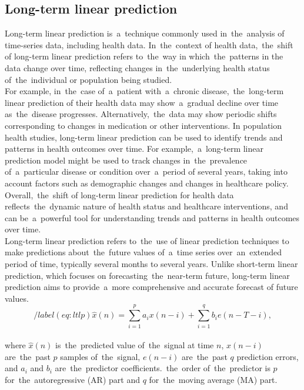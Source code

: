 \subsection{Long-term linear prediction}\label{subsec:longlp}
Long-term linear prediction is~a~technique commonly used in~the~analysis of time-series data, including health data.
In~the~context of health data,~the~shift of long-term linear prediction refers to~the~way in which~the~patterns in the
data change over time, reflecting changes in~the~underlying health status of~the~individual or population being studied.\\
For example, in~the~case of~a~patient with~a~chronic disease,~the~long-term linear prediction of their health data may
show~a~gradual decline over time as~the~disease progresses. Alternatively,~the~data may show periodic shifts
corresponding to changes in medication or other interventions. In population health studies, long-term linear
prediction can be used to identify trends and patterns in health outcomes over time. For example,~a~long-term linear
prediction model might be used to track changes in~the~prevalence of~a~particular disease or condition
over~a~period of several years, taking into account factors such as demographic changes and changes in healthcare policy.
Overall,~the~shift of long-term linear prediction for health data reflects~the~dynamic nature of health status and
healthcare interventions, and can be~a~powerful tool for understanding trends and patterns in health outcomes over time.
\\
Long-term linear prediction refers to~the~use of linear prediction techniques to make predictions about~the~future
values of~a~time series over~an~extended period of time, typically several months to several years. Unlike short-term
linear prediction, which focuses on forecasting~the~near-term future, long-term linear prediction aims to provide~a~more
comprehensive and accurate forecast of future values.\\
\begin{equation}/label(eq:ltlp)
    \hat{x}(n) = \sum_{i=1}^{p} a_i x(n-i) + \sum_{i=1}^{q} b_i e(n-T-i),
\end{equation}
\\
where $\hat{x}(n)$ is~the~predicted value of~the~signal at time $n$, $x(n-i)$ are~the~past $p$ samples of~the~signal, $e(n-i)$ are~the~past $q$ prediction errors, and $a_i$ and $b_i$ are~the~predictor coefficients.~the~order of~the~predictor is $p$ for~the~autoregressive (AR) part and $q$ for~the~moving average (MA) part.

